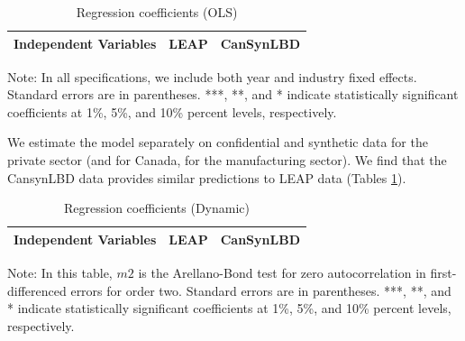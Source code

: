 \begin{table}[H]
  \centering
\begin{threeparttable}
 \caption{Regression coefficients (OLS)} \label{OLS} \medskip
\renewcommand{\arraystretch}{1}
\begin{tabular}{l|c c| c c}
\toprule
\textbf{Independent Variables}&\multicolumn{2}{c|}{\textbf{LEAP}} &  \multicolumn{2}{c}{\textbf{CanSynLBD}}\\
\midrule

   \bottomrule
  \end{tabular} 
\begin{tablenotes}
\small
\item Note: In all specifications, we include both year and industry fixed effects. Standard errors are in parentheses.  ***, **, and * indicate statistically significant coefficients at 1\%, 5\%, and 10\% percent levels, respectively.
 \end{tablenotes}
 \end{threeparttable}
\end{table}

We estimate the model separately on confidential and synthetic data for the private sector (and for Canada, for the manufacturing sector). We find that the CansynLBD data provides similar predictions to LEAP data (Tables  \ref{OLS}). 

\begin{table}[H]
  \centering
\begin{threeparttable}
 \caption{Regression coefficients (Dynamic)} \label{Dynamic - GMM} \medskip
\renewcommand{\arraystretch}{1}
\begin{tabular}{l|c c| c c}
\toprule
\textbf{Independent Variables}&\multicolumn{2}{c|}{\textbf{LEAP}} &  \multicolumn{2}{c}{\textbf{CanSynLBD}}\\
\midrule

   \bottomrule
  \end{tabular} 
\begin{tablenotes}
\small
\item Note: In this table, $m2$ is the Arellano-Bond test for zero autocorrelation in first-differenced errors for order two. Standard errors are in parentheses. ***, **, and * indicate statistically significant coefficients at 1\%, 5\%, and 10\% percent levels, respectively.
 \end{tablenotes}
 \end{threeparttable}
\end{table}

